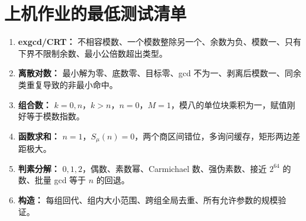 \section{上机作业的最低测试清单}
\begin{enumerate}
\item \textbf{exgcd/CRT：} 不相容模数、一个模数整除另一个、余数为负、模数一、只有下界不限制余数、最小公倍数超出类型。
\item \textbf{离散对数：} 最小解为零、底数零、目标零、gcd 不为一、剥离后模数一、同余类重复导致的非最小命中。
\item \textbf{组合数：} $k=0,n$，$k>n$，$n=0$，$M=1$，模八的单位块乘积为一，赋值刚好等于模数指数。
\item \textbf{函数求和：} $n=1$，$S_\mu(n)=0$，两个商区间错位，多询问缓存，矩形两边差距极大。
\item \textbf{判素分解：} $0,1,2$，偶数、素数幂、Carmichael 数、强伪素数、接近 $2^{64}$ 的数、批量 gcd 等于 $n$ 的回退。
\item \textbf{构造：} 每组回代、组内大小范围、跨组全局去重、所有允许参数的规模验证。
\end{enumerate}


